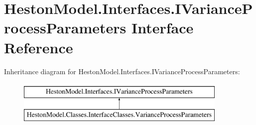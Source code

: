 \hypertarget{interface_heston_model_1_1_interfaces_1_1_i_variance_process_parameters}{}\section{Heston\+Model.\+Interfaces.\+I\+Variance\+Process\+Parameters Interface Reference}
\label{interface_heston_model_1_1_interfaces_1_1_i_variance_process_parameters}
Inheritance diagram for Heston\+Model.\+Interfaces.\+I\+Variance\+Process\+Parameters\+:\begin{figure}[H]
\begin{center}
\leavevmode
\includegraphics[height=2.000000cm]{interface_heston_model_1_1_interfaces_1_1_i_variance_process_parameters}
\end{center}
\end{figure}

